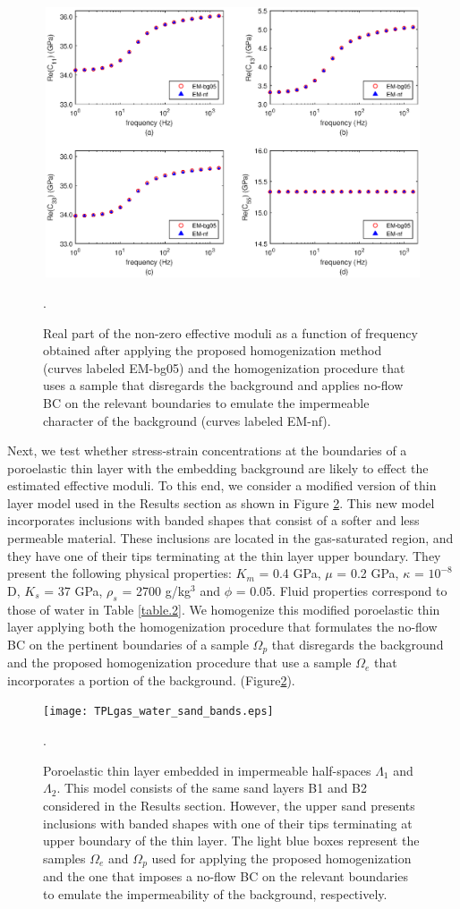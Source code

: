 \documentclass[draft]{agujournal2019}
\begin{document}
\begin{figure}[!ht]
\centering
        \includegraphics[width= 120mm, height=80mm]{cijnf_2sandshale.eps}
\caption{Real part of the non-zero effective moduli as a function of frequency obtained after applying the proposed homogenization method (curves labeled EM-bg05) and the homogenization procedure that uses a sample that disregards the background and applies no-flow BC on the relevant boundaries to emulate the impermeable character of the background (curves labeled EM-nf).}. 
\label{fig.6}
\end{figure}

Next, we test whether stress-strain concentrations at the boundaries of a poroelastic thin layer with the embedding background are likely to effect the estimated effective moduli. To this end, we consider a modified version of thin layer model used in the Results section as shown in Figure \ref{fig.7}. This new model incorporates inclusions with banded shapes that consist of a softer and less permeable material. These inclusions are located in the gas-saturated region, and they have one of their tips terminating at the thin layer upper boundary. They present the following physical properties: $K_m$ = 0.4 GPa,  $\mu$ = 0.2 GPa, $\kappa$ = $10^{-8}$ D, $K_s$ = 37 GPa, $\rho_s$ = 2700 g/kg$^3$ and $\phi$ = 0.05. Fluid properties correspond to those of water in Table \ref{table.2}. We homogenize this modified poroelastic thin layer applying both the homogenization procedure that formulates the no-flow BC on the pertinent boundaries of a sample $\Omega_p$ that disregards the background and the proposed homogenization procedure that use a sample $\Omega_e$ that incorporates a portion of the background. (Figure\ref{fig.7}).

\begin{figure}[!ht]
\centering
        \texttt{[image: TPLgas\_water\_sand\_bands.eps]}
\caption{Poroelastic thin layer embedded in impermeable half-spaces $\Lambda_1$ and $\Lambda_2$. This model consists of the same sand layers B1 and B2 considered in the Results section. However, the upper sand presents inclusions with banded shapes with one of their tips terminating at upper boundary of the thin layer. The light blue boxes represent the samples $\Omega_e$ and $\Omega_p$ used for applying the proposed homogenization and the one that imposes a no-flow BC on the relevant boundaries to emulate the impermeability of the background, respectively.}. 
\label{fig.7}
\end{figure}
\end{document}
